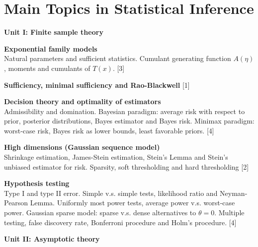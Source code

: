 \documentclass[a4paper]{article}
\begin{document}
	\maketitle

\section*{Main Topics in Statistical Inference}

{	\noindent\textbf{Unit I: Finite sample theory}
	
	\vspace{10pt}
	\noindent\textbf{Exponential family models}\\
	Natural parameters and sufficient statistics. Cumulant generating function $A(\eta)$, moments and cumulants of $T(x)$.\hspace*{\fill} [3]
	
	\vspace{10pt}
	\noindent\textbf{Sufficiency, minimal sufficiency and Rao-Blackwell}\hspace*{\fill} [1]
	
	\vspace{10pt}
	\noindent\textbf{Decision theory and optimality of estimators}\\
	Admissibility and domination. Bayesian paradigm: average risk with respect to prior, posterior distributions, Bayes estimator and Bayes risk. Minimax paradigm: worst-case risk, Bayes risk as lower bounds, least favorable priors.\hspace*{\fill} [4]
	
	\vspace{10pt}
	\noindent\textbf{High dimensions (Gaussian sequence model)}\\
	Shrinkage estimation, James-Stein estimation, Stein's Lemma and Stein's unbiased estimator for risk. Sparsity, soft thresholding and hard thresholding\hspace*{\fill} [2]
	
	\vspace{10pt}
	\noindent\textbf{Hypothesis testing}\\
	Type I and type II error. Simple v.s. simple tests, likelihood ratio and Neyman-Pearson Lemma. Uniformly most power tests, average power v.s. worst-case power. Gaussian sparse model: sparse v.s. dense alternatives to $\theta = 0$. Multiple testing, false discovery rate, Bonferroni procedure and Holm's procedure.\hspace*{\fill} [4]
	
	\vspace{15pt}
	\noindent\textbf{Unit II: Asymptotic theory}
	
}
\end{document}
